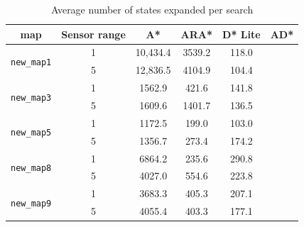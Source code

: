 \documentclass{article}
\begin{document}
\begin{table}[h]
    \centering
    \caption{Average number of states expanded per search}
    \begin{tabular}{|c|c|c|c|c|c|}
        \hline
        map                          &Sensor range & A*      &  ARA*       & D* Lite & AD* \\
        \hline 
\multirow{2}{*}{\texttt{new\_map1}}  &1            & 10,434.4&   3539.2    & 118.0   &  \\
                                     &5            & 12,836.5&   4104.9    & 104.4   &  \\
        \hline 
\multirow{2}{*}{\texttt{new\_map3}}  &1            & 1562.9  &  421.6      & 141.8   &  \\
                                     &5            & 1609.6  &  1401.7     & 136.5   &  \\
        \hline 
\multirow{2}{*}{\texttt{new\_map5}}  &1            & 1172.5  &  199.0     & 103.0   &  \\
                                     &5            & 1356.7  &  273.4     & 174.2   &  \\
        \hline 
\multirow{2}{*}{\texttt{new\_map8}}  &1            & 6864.2  &  235.6     & 290.8   &  \\
                                     &5            & 4027.0  &  554.6     & 223.8   &  \\
        \hline 
\multirow{2}{*}{\texttt{new\_map9}}  &1            & 3683.3  &  405.3     & 207.1   &  \\
                                     &5            & 4055.4  &  403.3     & 177.1   &  \\
        \hline
    \end{tabular}
    \label{table:states_expanded}
\end{table}
\end{document}
